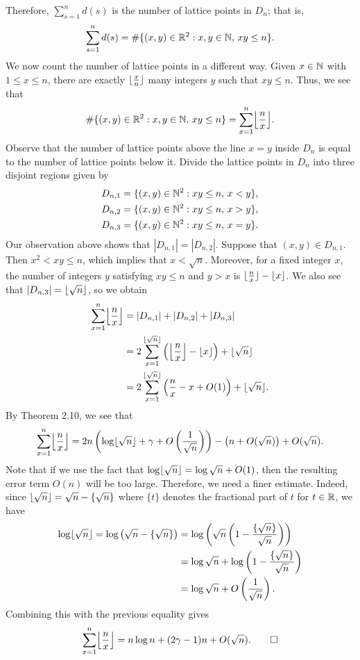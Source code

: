 \begin{pf}
Therefore, $\sum_{s=1}^n d(s)$ is the number of lattice points in $D_n$; that is, 
\[ \sum_{s=1}^n d(s) = \#\{(x, y) \in \mathbb{R}^2 : x, y \in \mathbb{N},\, xy \leq n\}. \]
We now count the number of lattice points in a different way. Given $x \in \mathbb{N}$ with $1 \leq x \leq n$, 
there are exactly $\lfloor\frac xn\rfloor$ many integers $y$ such that $xy \leq n$. Thus, we see that 
\[ \#\{(x, y) \in \R^2 : x, y \in \N,\, xy \leq n\} = \sum_{x=1}^n \floor*{\frac nx}. \]
Observe that the number of lattice points above the line $x = y$ inside $D_n$ is equal to the number of 
lattice points below it. Divide the lattice points in $D_n$ into three disjoint regions given by 
\begin{align*}
    D_{n,1} &= \{(x, y) \in \mathbb{N}^2 : xy \leq n,\, x < y\}, \\ 
    D_{n,2} &= \{(x, y) \in \mathbb{N}^2 : xy \leq n,\, x > y\}, \\
    D_{n,3} &= \{(x, y) \in \mathbb{N}^2 : xy \leq n,\, x = y\}.
\end{align*}
Our observation above shows that $|D_{n,1}| = |D_{n,2}|$. Suppose that $(x, y) \in D_{n,1}$. Then 
$x^2 < xy \leq n$, which implies that $x < \sqrt n$. Moreover, for a fixed integer $x$, the number of 
integers $y$ satisfying $xy \leq n$ and $y > x$ is $\lfloor\frac nx\rfloor - \lfloor x\rfloor$. We also see that 
$|D_{n,3}| = \lfloor\sqrt n\rfloor$, so we obtain 
\begin{align*}
    \sum_{x=1}^n \floor*{\frac nx} &= |D_{n,1}| + |D_{n,2}| + |D_{n,3}| \\
    &= 2 \sum_{x=1}^{\floor{\sqrt n}} \left( \floor*{\frac nx} - \floor x \right) + \floor{\sqrt n} \\
    &= 2 \sum_{x=1}^{\floor{\sqrt n}} \left( \frac nx - x + O(1) \right) + \floor{\sqrt n}. 
\end{align*}
By Theorem 2.10, we see that 
\[ \sum_{x=1}^n \floor*{\frac nx} = 2n \left( \log\floor{\sqrt n} + \gamma + O\left( \frac1{\sqrt n} \right) \right) - \left( n + O(\sqrt n) \right) + O(\sqrt n). \]
Note that if we use the fact that $\log\lfloor\sqrt n\rfloor = \log \sqrt n + O(1)$, then the resulting 
error term $O(n)$ will be too large. Therefore, we need a finer estimate. Indeed, since 
$\lfloor\sqrt n\rfloor = \sqrt n - \{\sqrt n\}$ where $\{t\}$ denotes the fractional part of $t$ for 
$t \in \mathbb{R}$, we have 
\begin{align*} \log \lfloor\sqrt n\rfloor = \log \left( \sqrt n - \{\sqrt n\} \right) 
&= \log \left( \sqrt n \left( 1 - \frac{\{\sqrt n\}}{\sqrt n} \right) \right) \\
&= \log \sqrt n + \log \left( 1 - \frac{\{\sqrt n\}}{\sqrt n} \right) \\
&= \log \sqrt n + O\left( \frac1{\sqrt n} \right). \end{align*}
Combining this with the previous equality gives 
\[ \sum_{x=1}^n \floor*{\frac nx} = n\log n + (2\gamma - 1)n + O(\sqrt n). \qedhere \]
\end{pf}

